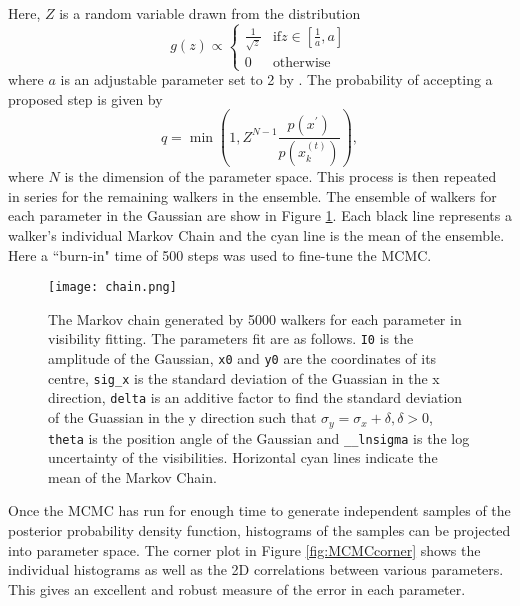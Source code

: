 Here, $Z$ is a random variable drawn from the distribution
\begin{equation}
\label{eq:MCMC_g}
g(z) \propto 
\begin{cases}
\frac{1}{\sqrt{z}} & \mbox{if} z \in \left[\frac{1}{a}, a \right] \\
0 & \mbox{otherwise}
\end{cases}
\end{equation}
where $a$ is an adjustable parameter set to 2 by \cite{Goodman2010}. The probability of accepting a proposed step is given by
\begin{equation}
\label{eq:MCMC_stretch_newstate}
q = \min \left(1, Z^{N-1} \frac{p(x^\prime)}{p(x_k^{(t)})}\right),
\end{equation} 
where $N$ is the dimension of the parameter space. This process is then repeated in series for the remaining walkers in the ensemble.
The ensemble of walkers for each parameter in the Gaussian are show in Figure \ref{fig:MCMCchain}. Each black line represents a walker's individual Markov Chain and the cyan line is the mean of the ensemble. Here a ``burn-in" time of 500 steps was used to fine-tune the MCMC. 
\begin{figure}[ht]
\centering
\texttt{[image: chain.png]}
\caption[The Markov chain generated by 5000 walkers for each parameter in visibility fitting.]{The Markov chain generated by 5000 walkers for each parameter in visibility fitting. The parameters fit are as follows. \texttt{I0} is the amplitude of the Gaussian, \texttt{x0} and \texttt{y0} are the coordinates of its centre, \texttt{sig\_x} is the standard deviation of the Guassian in the x direction, \texttt{delta} is an additive factor to find the standard deviation of the Guassian in the y direction such that $\sigma_y = \sigma_x + \delta, \delta > 0$, \texttt{theta} is the position angle of the Gaussian and \texttt{\_\_lnsigma} is the log uncertainty of the visibilities. Horizontal cyan lines indicate the mean of the Markov Chain.}
\label{fig:MCMCchain}
\end{figure}

Once the MCMC has run for enough time to generate independent samples of the posterior probability density function, histograms of the samples can be projected into parameter space. The corner plot in Figure \ref{fig:MCMCcorner} shows the individual histograms as well as the 2D correlations between various parameters. This gives an excellent and robust measure of the error in each parameter.

